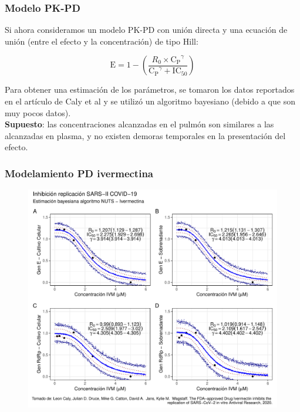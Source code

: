 \documentclass[12pt,xcolor=dvipsnames]{beamer}
\begin{document}
	\begin{frame}
		\frametitle[short frame title]{Modelo PK-PD}
		\footnotesize
		Si ahora consideramos un modelo PK-PD con unión directa y una ecuación de unión (entre el efecto y la concentración) de tipo Hill: 
		
		\begin{equation}\label{Eq_1}
			\mathrm{E} = 1 - \left(\frac{R_0\times\mathrm{C_P}^\gamma}{\mathrm{C_P}^\gamma + \mathrm{IC_{50}}}\right)
		\end{equation}
		
		Para obtener una estimación de los parámetros, se tomaron los datos reportados en el artículo de Caly et al \cite{Caly2020} y se utilizó un algoritmo bayesiano (debido a que son muy pocos datos). \\
		\vspace{2em}
		\textbf{Supuesto}: las concentraciones alcanzadas en el pulmón son similares a las alcanzadas en plasma, y no existen demoras temporales en la presentación del efecto.
		
	\end{frame}
	
	\begin{frame}
		\frametitle{Modelamiento PD ivermectina}
		\begin{figure}
			\centering
			\includegraphics[width=0.8\linewidth]{../modelo_PD/modelo_ivermectina}
			\label{fig:modeloivermectina}
		\end{figure}
	\end{frame}
	
\end{document}

